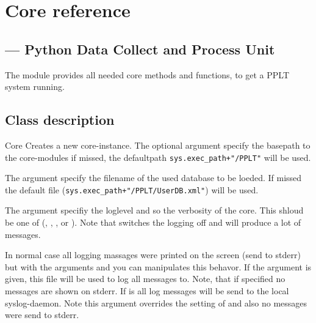 \chapter{Core reference}
\section{ --- 
        \textbf{Py}thon \textbf{D}ata \textbf{C}ollect and \textbf{P}rocess \textbf{U}nit}





The  module provides all needed core methods and functions, to
get a PPLT system running.

\section{Class description}
\begin{classdesc}{Core}{}
Creates a new core-instance. The optional argument  specify the basepath to the core-modules if missed,
the defaultpath \texttt{sys.exec\_path+"/PPLT"} will be used. 

The argument  specify the filename of the
used database to be loeded. If missed the default file (\texttt{sys.exec\_path+"/PPLT/UserDB.xml"}) will be used.


The argument  specifiy the loglevel and so the verbosity of the core. This shloud be one of (, 
, ,  or ). Note that  switches the logging off and 
 will produce a lot of messages. 

In normal case all logging massages were printed on the screen (send to stderr) but with the arguments  and
 you can manipulates this behavor. If the argument  is given, this file will be used to 
log all messages to. Note, that if  specified no messages are shown on stderr. If  is 
all log messages will be send to the local syslog-daemon. Note this argument overrides the setting of  and
also no messages were send to stderr.
\end{classdesc}

